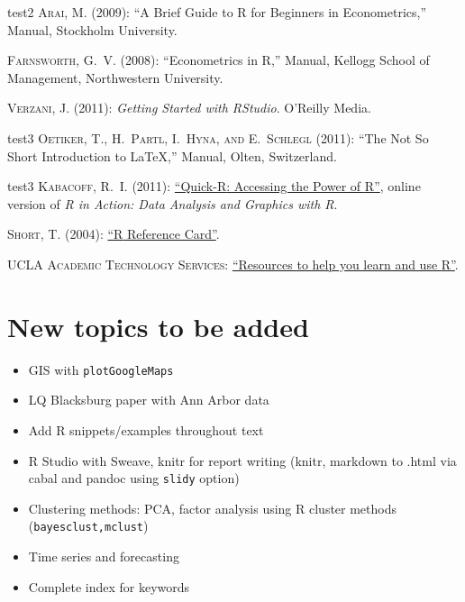\renewcommand\bibname{\normalsize{Getting started with R}}
\begin{thebibliography}{test2}
 \textsc{Arai, M.}  (2009): ``A Brief Guide to \textsf{R} for Beginners in Econometrics,'' Manual, Stockholm University.

 \textsc{Farnsworth, G.~V.}  (2008): ``Econometrics in \textsf{R},'' Manual, Kellogg  School of Management, Northwestern University.

\textsc{Verzani, J.}  (2011): \emph{Getting Started with RStudio}. O'Reilly Media.
\end{thebibliography}


\renewcommand\bibname{\normalsize{Getting started with \LaTeX}}
\begin{thebibliography}{test3}
\textsc{Oetiker, T., H.~Partl, I.~Hyna,  {\small and} E.~Schlegl}  (2011): ``The Not So Short Introduction to \LaTeX,'' Manual, Olten, Switzerland.
\end{thebibliography}

\renewcommand\bibname{\normalsize{Online resources}}
\begin{thebibliography}{test3}
 \textsc{Kabacoff, R.~I.} (2011): \href{http://www.statmethods.net/index.html}{``Quick-\textsf{R}: Accessing the Power of \textsf{R}''}, online version of \emph{\textsf{R} in Action: Data Analysis and Graphics with \textsf{R}}.

 \textsc{Short, T.} (2004): \href{http://cran.r-project.org/doc/contrib/Short-refcard.pdf}{``\textsf{R} Reference Card''}.

 \textsc{UCLA Academic Technology Services}: \href{http://www.ats.ucla.edu/stat/r/}{``Resources to help you learn and use \textsf{R}''}.
\end{thebibliography}

\section{New topics to be added}
\begin{itemize}
\item GIS with \texttt{plotGoogleMaps}
\item LQ Blacksburg paper with Ann Arbor data
\item Add R snippets/examples throughout text
\item R Studio with Sweave, knitr for report writing (knitr, markdown to .html via cabal and pandoc using \texttt{slidy} option)
\item Clustering methods: PCA, factor analysis using R cluster methods (\texttt{bayesclust,mclust})
\item Time series and forecasting
\item Complete index for keywords
\end{itemize}

